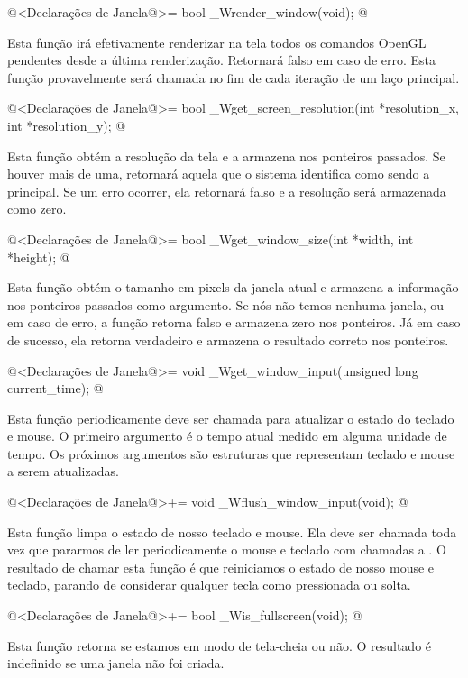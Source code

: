 \iniciocodigo
@<Declarações de Janela@>=
bool _Wrender_window(void);
@
\fimcodigo

Esta função irá efetivamente renderizar na tela todos os comandos
OpenGL pendentes desde a última renderização. Retornará falso em caso
de erro. Esta função provavelmente será chamada no fim de cada
iteração de um laço principal.

\iniciocodigo
@<Declarações de Janela@>=
bool _Wget_screen_resolution(int *resolution_x, int *resolution_y);
@
\fimcodigo

Esta função obtém a resolução da tela e a armazena nos ponteiros
passados. Se houver mais de uma, retornará aquela que o sistema
identifica como sendo a principal. Se um erro ocorrer, ela retornará
falso e a resolução será armazenada como zero.

\iniciocodigo
@<Declarações de Janela@>=
bool _Wget_window_size(int *width, int *height);
@
\fimcodigo

Esta função obtém o tamanho em pixels da janela atual e armazena a
informação nos ponteiros passados como argumento. Se nós não temos
nenhuma janela, ou em caso de erro, a função retorna falso e armazena
zero nos ponteiros. Já em caso de sucesso, ela retorna verdadeiro e
armazena o resultado correto nos ponteiros.

\iniciocodigo
@<Declarações de Janela@>=
void _Wget_window_input(unsigned long current_time);
@
\fimcodigo

Esta função periodicamente deve ser chamada para atualizar o estado do
teclado e mouse. O primeiro argumento é o tempo atual medido em alguma
unidade de tempo. Os próximos argumentos são estruturas que
representam teclado e mouse a serem atualizadas.

\iniciocodigo
@<Declarações de Janela@>+=
void _Wflush_window_input(void);
@
\fimcodigo

Esta função limpa o estado de nosso teclado e mouse. Ela deve ser
chamada toda vez que pararmos de ler periodicamente o mouse e teclado
com chamadas a . O resultado de
chamar esta função é que reiniciamos o estado de nosso mouse e
teclado, parando de considerar qualquer tecla como pressionada ou
solta.

\iniciocodigo
@<Declarações de Janela@>+=
bool _Wis_fullscreen(void);
@
\fimcodigo

Esta função retorna se estamos em modo de tela-cheia ou não. O
resultado é indefinido se uma janela não foi criada.


